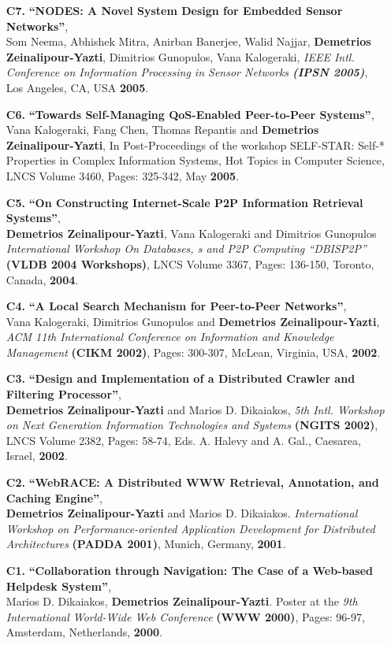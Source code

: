 \documentclass[10pt]{article}
\begin{document}
\begin{enumerate}
\item[{\bf C7.}]
\label{C7}
{\bf ``NODES: A Novel System Design for Embedded Sensor Networks''},\\
Som Neema, Abhishek Mitra, Anirban Banerjee, Walid Najjar, {\bf Demetrios Zeinalipour-Yazti}, Dimitrios Gunopulos, Vana Kalogeraki,
{\em IEEE Intl. Conference on Information Processing in Sensor Networks {\bf (IPSN 2005)}}, 
Los Angeles, CA, USA {\bf 2005}.

\item[{\bf C6.}]
\label{C6}
{\bf ``Towards Self-Managing QoS-Enabled Peer-to-Peer Systems''},\\
Vana Kalogeraki, Fang Chen, Thomas Repantis and {\bf Demetrios Zeinalipour-Yazti},
In Post-Proceedings of the workshop SELF-STAR: Self-* Properties in Complex Information Systems, 
Hot Topics in Computer Science, LNCS Volume 3460, Pages: 325-342, May {\bf 2005}.

\item[{\bf C5.}]
\label{C5} 
{\bf ``On Constructing Internet-Scale P2P Information Retrieval Systems''},\\
{\bf Demetrios Zeinalipour-Yazti}, Vana Kalogeraki and Dimitrios Gunopulos
{\em International Workshop On Databases, s and P2P Computing ``DBISP2P''}
{\bf (VLDB 2004 Workshops)}, LNCS Volume 3367, Pages: 136-150, Toronto, Canada, {\bf 2004}.

\item[{\bf C4.}] 
\label{C4} 
{\bf ``A Local Search Mechanism for Peer-to-Peer Networks''}, \\
Vana Kalogeraki, Dimitrios Gunopulos and {\bf Demetrios Zeinalipour-Yazti},
{\em ACM 11th International Conference on Information and Knowledge Management}
{\bf (CIKM 2002)}, Pages: 300-307, McLean, Virginia, USA, {\bf 2002}.

\item[{\bf C3.}]
\label{C3}
{\bf ``Design and Implementation of a Distributed Crawler and Filtering Processor''}, \\
{\bf Demetrios Zeinalipour-Yazti} and Marios D. Dikaiakos,
{\em 5th Intl. Workshop on Next Generation Information Technologies and Systems} {\bf (NGITS 2002)}, 
LNCS Volume 2382, Pages: 58-74, Eds. A. Halevy and A. Gal., Caesarea, Israel, {\bf 2002}.

\item[{\bf C2.}]
\label{C2}
{\bf ``WebRACE: A Distributed WWW Retrieval, Annotation, and Caching Engine''}, \\
{\bf Demetrios Zeinalipour-Yazti} and Marios D. Dikaiakos. {\em International Workshop on Performance-oriented} 
{\em Application Development for Distributed Architectures} {\bf (PADDA 2001)}, Munich, Germany, {\bf 2001}. 	

\item[{\bf C1.}] 
\label{C1}
{\bf ``Collaboration through Navigation: The Case of a Web-based Helpdesk System''},\\
Marios D. Dikaiakos, {\bf Demetrios Zeinalipour-Yazti}. Poster at the {\em  9th International World-Wide Web Conference} {\bf (WWW 2000)}, Pages: 96-97, Amsterdam, Netherlands, {\bf 2000}.   

\end{enumerate}
\end{document}
